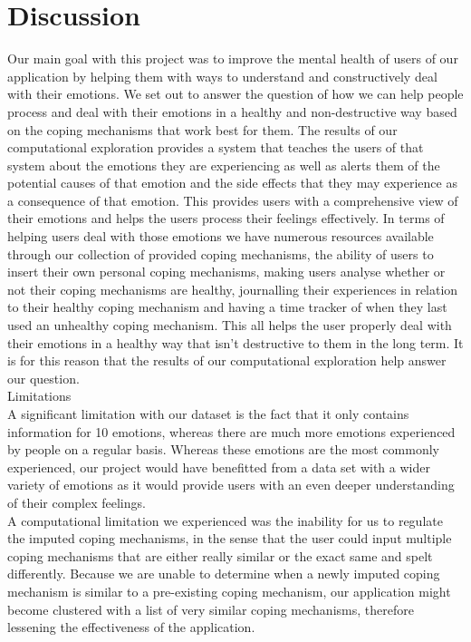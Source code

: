 \documentclass{article}
\begin{document}
    \section{Discussion}
    Our main goal with this project was to improve the mental health of users of our application by helping them with ways to understand and constructively deal with their emotions. We set out to answer the question of how we can help people process and deal with their emotions in a healthy and non-destructive way based on the coping mechanisms that work best for them. The results of our computational exploration provides a system that teaches the users of that system about the emotions they are experiencing as well as alerts them of the potential causes of that emotion and the side effects that they may experience as a consequence of that emotion. This provides users with a comprehensive view of their emotions and helps the users process their feelings effectively. In terms of helping users deal with those emotions we have numerous resources available through our collection of provided coping mechanisms, the ability of users to insert their own personal coping mechanisms, making users analyse whether or not their coping mechanisms are healthy, journalling their experiences in relation to their healthy coping mechanism and having a time tracker of when they last used an unhealthy coping mechanism. This all helps the user properly deal with their emotions in a healthy way that isn’t destructive to them in the long term. It is for this reason that the results of our computational exploration help answer our question. \\

    Limitations\\

    A significant limitation with our dataset is the fact that it only contains information for 10 emotions, whereas there are much more emotions experienced by people on a regular basis. Whereas these emotions are the most commonly experienced, our project would have benefitted from a data set with a wider variety of emotions as it would provide users with an even deeper understanding of their complex feelings. \\

    A computational limitation we experienced was the inability for us to regulate the imputed coping mechanisms, in the sense that the user could input multiple coping mechanisms that are either really similar or the exact same and spelt differently. Because we are unable to determine when a newly imputed coping mechanism is similar to a pre-existing coping mechanism, our application might become clustered with a list of very similar coping mechanisms, therefore lessening the effectiveness of the application. \\
\end{document}
